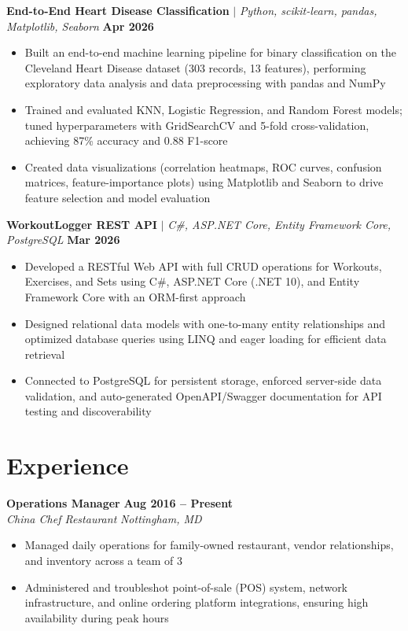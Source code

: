 \documentclass[11pt,letterpaper]{article}
\newcommand{\job}[4]{
    \noindent\textbf{#1} \hfill \textbf{#2}\\
    \textit{#3} \hfill \textit{#4}
}
\newcommand{\project}[3]{
    \noindent\textbf{#1} $\mid$ \textit{#2} \hfill \textbf{#3}
}
\begin{document}
\project{End-to-End Heart Disease Classification}{Python, scikit-learn, pandas, Matplotlib, Seaborn}{Apr 2026}
\begin{itemize}
    \item Built an end-to-end machine learning pipeline for binary classification on the Cleveland Heart Disease dataset (303 records, 13 features), performing exploratory data analysis and data preprocessing with pandas and NumPy
    \item Trained and evaluated KNN, Logistic Regression, and Random Forest models; tuned hyperparameters with GridSearchCV and 5-fold cross-validation, achieving 87\% accuracy and 0.88 F1-score
    \item Created data visualizations (correlation heatmaps, ROC curves, confusion matrices, feature-importance plots) using Matplotlib and Seaborn to drive feature selection and model evaluation
\end{itemize}

\project{WorkoutLogger REST API}{C\#, ASP.NET Core, Entity Framework Core, PostgreSQL}{Mar 2026}
\begin{itemize}
    \item Developed a RESTful Web API with full CRUD operations for Workouts, Exercises, and Sets using C\#, ASP.NET Core (.NET 10), and Entity Framework Core with an ORM-first approach
    \item Designed relational data models with one-to-many entity relationships and optimized database queries using LINQ and eager loading for efficient data retrieval
    \item Connected to PostgreSQL for persistent storage, enforced server-side data validation, and auto-generated OpenAPI/Swagger documentation for API testing and discoverability
\end{itemize}



\section{Experience}

\job{Operations Manager}{Aug 2016 -- Present}{China Chef Restaurant}{Nottingham, MD}
\begin{itemize}
    \item Managed daily operations for family-owned restaurant, vendor relationships, and inventory across a team of 3
    \item Administered and troubleshot point-of-sale (POS) system, network infrastructure, and online ordering platform integrations, ensuring high availability during peak hours
\end{itemize}
\end{document}

